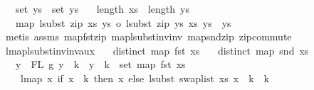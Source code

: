 \begin{isabellebody}
\ \ \ {\isachardoublequoteopen}set\ ys{\isacharprime}{\kern0pt}\ {\isasymsubseteq}\ set\ ys{\isachardoublequoteclose}\isanewline
\ \ \ {\isachardoublequoteopen}length\ xs\ {\isacharequal}{\kern0pt}\ length\ ys{\isachardoublequoteclose}\isanewline
\ \ \ {\isachardoublequoteopen}map\ {\isacharparenleft}{\kern0pt}lsubst\ {\isacharparenleft}{\kern0pt}zip\ xs\ ys{\isacharparenright}{\kern0pt}\ o\ lsubst\ {\isacharparenleft}{\kern0pt}zip\ ys\ xs{\isacharparenright}{\kern0pt}{\isacharparenright}{\kern0pt}\ ys{\isacharprime}{\kern0pt}\ {\isacharequal}{\kern0pt}\ ys{\isacharprime}{\kern0pt}{\isachardoublequoteclose}\isanewline
%
\isadelimproof
%
\endisadelimproof
%
\isatagproof
{}\isamarkupfalse%
\ {\isacharparenleft}{\kern0pt}metis\ assms{\isacharparenleft}{\kern0pt}{}{\isacharcomma}{\kern0pt}{}{\isacharcomma}{\kern0pt}{}{\isacharparenright}{\kern0pt}\ map{\isacharunderscore}{\kern0pt}fst{\isacharunderscore}{\kern0pt}zip\ map{\isacharunderscore}{\kern0pt}lsubst{\isacharunderscore}{\kern0pt}inv{\isacharunderscore}{\kern0pt}inv\ map{\isacharunderscore}{\kern0pt}snd{\isacharunderscore}{\kern0pt}zip\ zip{\isacharunderscore}{\kern0pt}commute{\isacharparenright}{\kern0pt}%
\endisatagproof
{\isafoldproof}%
%
\isadelimproof
\isanewline
%
\endisadelimproof
\isanewline
\isanewline
{}\isamarkupfalse%
\ lmap{\isacharunderscore}{\kern0pt}lsubst{\isacharunderscore}{\kern0pt}inv{\isacharunderscore}{\kern0pt}inv{\isacharunderscore}{\kern0pt}aux{\isacharcolon}{\kern0pt}\isanewline
\ \ \ {\isachardoublequoteopen}distinct\ {\isacharparenleft}{\kern0pt}map\ fst\ xs{\isacharparenright}{\kern0pt}{\isachardoublequoteclose}\isanewline
\ \ \ {\isachardoublequoteopen}distinct\ {\isacharparenleft}{\kern0pt}map\ snd\ xs{\isacharparenright}{\kern0pt}{\isachardoublequoteclose}\isanewline
\ \ \ {\isachardoublequoteopen}{\isasymforall}y\ {\isasymin}\ FL\ g{\isachardot}{\kern0pt}\ y\ {\isachargreater}{\kern0pt}{\isacharequal}{\kern0pt}\ k\ {\isacharminus}{\kern0pt}{\isacharminus}{\kern0pt}{\isachargreater}{\kern0pt}\ y\ {\isacharminus}{\kern0pt}\ k\ {\isasymin}\ set\ {\isacharparenleft}{\kern0pt}map\ fst\ xs{\isacharparenright}{\kern0pt}{\isachardoublequoteclose}\isanewline
\ \ \ \ {\isachardoublequoteopen}lmap\ {\isacharparenleft}{\kern0pt}{\isasymlambda}x{\isachardot}{\kern0pt}\ if\ x\ {\isacharless}{\kern0pt}\ k\ then\ x\ else\ {\isacharparenleft}{\kern0pt}lsubst\ {\isacharparenleft}{\kern0pt}swap{\isacharunderscore}{\kern0pt}list\ xs{\isacharparenright}{\kern0pt}\ {\isacharparenleft}{\kern0pt}x\ {\isacharminus}{\kern0pt}\ k{\isacharparenright}{\kern0pt}\ {\isacharplus}{\kern0pt}\ k{\isacharparenright}{\kern0pt}{\isacharparenright}{\kern0pt}\isanewline

\end{isabellebody}
